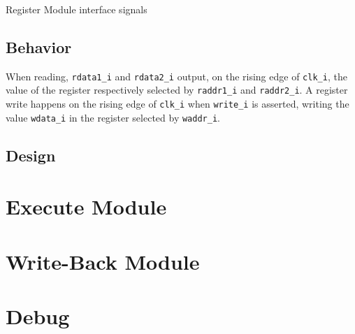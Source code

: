 \begin{table}[H]
  \centering
  
  \caption{Register Module interface signals}
  \label{tab:regm-interface}
\end{table}

\subsection{Behavior}

\begin{content}
  When reading, \texttt{rdata1\_i} and \texttt{rdata2\_i} output, on the rising edge of \texttt{clk\_i}, the value of the register respectively selected by \texttt{raddr1\_i} and \texttt{raddr2\_i}. A register write happens on the rising edge of \texttt{clk\_i} when \texttt{write\_i} is asserted, writing the value \texttt{wdata\_i} in the register selected by \texttt{waddr\_i}.
\end{content}

\subsection{Design}

\newpage

\section{Execute Module}
\newpage

\section{Write-Back Module}
\newpage

\section{Debug}
\newpage
